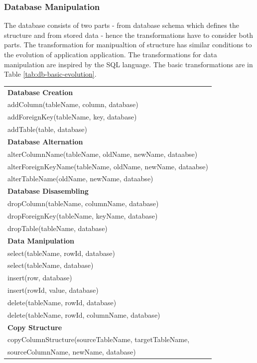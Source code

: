 \documentclass[11pt]{article}
\begin{document}
\subsubsection{Database Manipulation}
\label{sec:db-evolution}
The database consists of two parts - from database schema which defines the structure and from stored data - hence the transformations have to consider both parts. The transformation for manipualtion of structure has similar conditions to the evolution of application application. The transformations for data manipulation are inspired by the SQL language. The basic transformations are in Table \ref{tab:db-basic-evolution}. 
\begin{table}
\centering
	\begin{tabular}{|l|}
	\hline
	\textbf{Database Creation} \\
	addColumn(tableName, column, database) \\
	addForeignKey(tableName, key, database) \\
	addTable(table, database)\\
	\textbf{Database Alternation} \\
	alterColumnName(tableName, oldName, newName, dataabse) \\
	alterForeignKeyName(tableName, oldName, newName, dataabse) \\
	alterTableName(oldName, newName, dataabse) \\
	\textbf{Database Disasembling} \\
	dropColumn(tableName, columnName, database) \\
	dropForeignKey(tableName, keyName, database) \\
	dropTable(tableName, database) \\
	\textbf{Data Manipulation} \\
	select(tableName, rowId, database) \\
	select(tableName, database) \\
	insert(row, database) \\
	insert(rowId, value, database) \\
	delete(tableName, rowId, database) \\
	delete(tableName, rowId, columnName, database) \\
	\textbf{Copy Structure} \\
	copyColumnStructure(sourceTableName, targetTableName, \\  \hspace{0.5in} sourceColumnName, newName, database) \\

\end{tabular}
\end{table}
\end{document}
